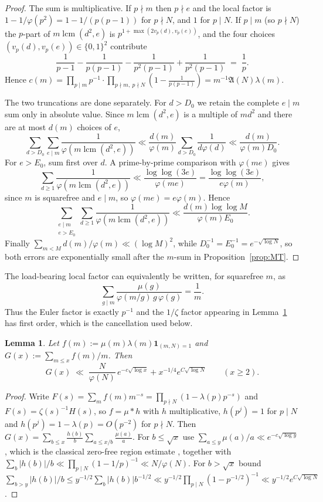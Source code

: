 \documentclass[11pt,a4paper]{article}
\theoremstyle{plain}
\newtheorem{lemma}[theorem]{Lemma}
\theoremstyle{definition}
\theoremstyle{remark}
\newcommand{\AAA}{\mathfrak{A}}
\DeclareMathOperator{\lcm}{lcm}
\begin{document}
\begin{proof}
The sum is multiplicative. If $p\nmid m$ then $p\nmid e$ and the local
factor is $1-1/\varphi(p^2)=1-1/(p(p-1))$ for $p\nmid N$, and $1$ for
$p\mid N$. If $p\mid m$ (so $p\nmid N$) the $p$-part of
$m\lcm(d^2,e)$ is $p^{1+\max(2v_p(d),v_p(e))}$, and the four choices
$(v_p(d),v_p(e))\in\{0,1\}^2$ contribute
\[
  \frac{1}{p-1}-\frac{1}{p(p-1)}-\frac{1}{p^2(p-1)}+\frac{1}{p^2(p-1)}
  \;=\;\frac{1}{p}.
\]
Hence $c(m)=\prod_{p\mid m}p^{-1}\cdot
\prod_{p\nmid m,\ p\nmid N}(1-\tfrac{1}{p(p-1)})
=m^{-1}\AAA(N)\lambda(m)$.

The two truncations are done separately.  For $d>D_0$ we retain the
complete $e\mid m$ sum only in absolute value.  Since
$m\lcm(d^2,e)$ is a multiple of $md^2$ and there are at most $d(m)$
choices of $e$,
\[
 \sum_{d>D_0}\sum_{e\mid m}
 \frac1{\varphi(m\lcm(d^2,e))}
 \ll \frac{d(m)}{\varphi(m)}
       \sum_{d>D_0}\frac1{d\varphi(d)}
 \ll \frac{d(m)}{\varphi(m)D_0}.
\]
For $e>E_0$, sum first over $d$.  A prime-by-prime comparison with
$\varphi(me)$ gives
\[
 \sum_{d\ge1}\frac1{\varphi(m\lcm(d^2,e))}
 \ll \frac{\log\log(3e)}{\varphi(me)}
 = \frac{\log\log(3e)}{e\varphi(m)},
\]
since $m$ is squarefree and $e\mid m$, so $\varphi(me)=e\varphi(m)$.  Hence
\begin{equation}\label{eq:etail}
 \sum_{\substack{e\mid m\\e>E_0}}\sum_{d\ge1}
 \frac1{\varphi(m\lcm(d^2,e))}
 \ll \frac{d(m)\log\log M}{\varphi(m)E_0}.
\end{equation}
Finally $\sum_{m<M}d(m)/\varphi(m)\ll(\log M)^2$, while
$D_0^{-1}=E_0^{-1}=e^{-\sqrt{\log N}}$, so both errors are exponentially
small after the $m$-sum in Proposition~\ref{prop:MT}.
\end{proof}

The load-bearing local factor can equivalently be written, for squarefree
$m$, as
\[
  \sum_{g\mid m}\frac{\mu(g)}{\varphi(m/g)\,g\,\varphi(g)}=\frac1m .
\]
Thus the Euler factor is exactly $p^{-1}$ and the $1/\zeta$ factor
appearing in Lemma~\ref{lem:mu} has first order, which is the
cancellation used below.

\begin{lemma}\label{lem:mu}
Let $f(m):=\mu(m)\lambda(m)\mathbf 1_{(m,N)=1}$ and
$G(x):=\sum_{m\le x}f(m)/m$. Then
\[
  G(x)\;\ll\;\frac{N}{\varphi(N)}\,e^{-c\sqrt{\log x}}
   +x^{-1/4}e^{C\sqrt{\log N}}
   \qquad(x\ge2).
\]
\end{lemma}

\begin{proof}
Write $F(s)=\sum_m f(m)m^{-s}=\prod_{p\nmid N}(1-\lambda(p)p^{-s})$
and $F(s)=\zeta(s)^{-1}H(s)$, so $f=\mu*h$ with $h$ multiplicative,
$h(p^j)=1$ for $p\mid N$ and $h(p^j)=1-\lambda(p)=O(p^{-2})$ for
$p\nmid N$. Then
$G(x)=\sum_{b\le x}\frac{h(b)}{b}\sum_{a\le x/b}\frac{\mu(a)}{a}$. For
$b\le\sqrt x$ use $\sum_{a\le y}\mu(a)/a\ll e^{-c\sqrt{\log y}}$, which
is the classical zero-free region estimate \cite{MoV}, together with
$\sum_b|h(b)|/b\ll\prod_{p\mid N}(1-1/p)^{-1}\ll N/\varphi(N)$. For
$b>\sqrt x$ bound
$\sum_{b>y}|h(b)|/b\le y^{-1/2}\sum_b|h(b)|b^{-1/2}
\ll y^{-1/2}\prod_{p\mid N}(1-p^{-1/2})^{-1}\ll y^{-1/2}e^{C\sqrt{\log N}}$.
\end{proof}
\end{document}
